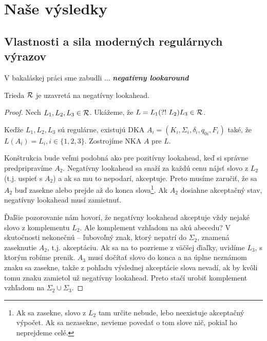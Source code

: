 \chapter{Naše výsledky}
\label{chap:vysledky}

\section[Vlastnosti a sila]{Vlastnosti a sila moderných regulárnych výrazov}
\label{vsila}

V bakaláskej práci sme zabudli ... \textbf{\textit{negatívny lookaround}} \todo

\begin{lema}\label{nla+R}
Trieda ${\cal R}$ je uzavretá na negatívny lookahead.
\end{lema}
\begin{proof}
Nech $L_1,L_2,L_3 \in {\cal R}$. Ukážeme, že $L=L_1\text{(?!~} L_2)L_3 \in {\cal R}$.

Keďže $ L_{1},L_{2},L_{3} $ sú regulárne, existujú DKA $ A_{i} = (K_{i},\Sigma_{i},\delta_{i},q_{0i},F_{i}) $ také, že $ L(A_{i})=L_{i}, i \in \lbrace 1,2,3\rbrace $. Zostrojíme NKA $A$ pre $L$.

Konštrukcia bude veľmi podobná ako pre pozitívny lookahead, keď si správne predpripravíme $A_2$. Negatívny lookahead sa snaží za každú cenu nájsť slovo z $L_2$ (t.j. uspieť s $A_2$) a ak sa mu to nepodarí, akceptuje. Preto musíme zaručiť, že sa $A_2$ buď zasekne alebo prejde až do konca slova\footnote{Ak sa zasekne, slovo z $L_2$ tam určite nebude, lebo neexistuje akceptačný výpočet. Ak sa nezasekne, nevieme povedať o tom slove nič, pokiaľ ho neprejdeme celé.}. Ak $A_2$ dosiahne akceptačný stav, negatívny lookahead musí zamietnuť. 

Ďaľšie pozorovanie nám hovorí, že negatívny lookahead akceptuje vždy nejaké slovo z komplementu $L_2$. Ale komplement vzhľadom na akú abecedu? V skutočnosti nekonečnú -- ľubovoľný znak, ktorý nepatrí do $\Sigma_2$, znamená zaseknutie $A_2$, t.j. akceptáciu. Ak sa na to pozrieme z väčšej ďiaľky, uvidíme $L_3$, s ktorým robíme prenik. $A_3$ musí dočítať slovo do konca a na úplne neznámom znaku sa zasekne, takže z pohľadu výslednej akceptácie slova nevadí, ak by kvôli tomu znaku zamietol už negatívny lookahead. Preto stačí urobiť komplement vzhľadom na $\Sigma_2 \cup \Sigma_3$. 


\end{proof}

